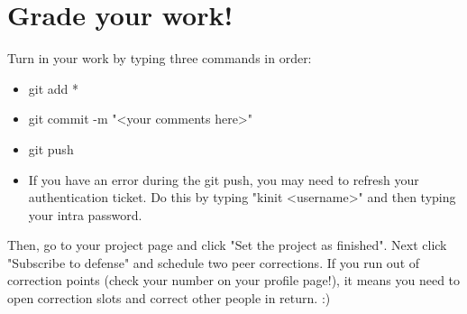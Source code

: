 \documentclass{42-en}
\begin{document}

\chapter{Grade your work!}

Turn in your work by typing three commands in order: 
\begin{itemize}
	\item git add *
	\item git commit -m "<your comments here>"
	\item git push
	\item If you have an error during the git push, you may need to refresh your authentication ticket. Do this by typing "kinit <username>" and then typing your intra password.
\end{itemize}

Then, go to your project page and click "Set the project as finished".
Next click "Subscribe to defense" and schedule two peer corrections.
If you run out of correction points (check your number on your profile page!), it means you need to open correction slots and correct other people in return. :)
\end{document}
